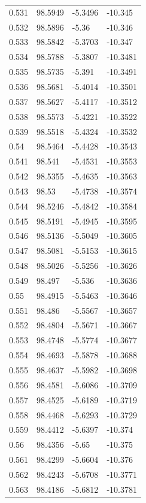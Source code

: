 \begin{tabular}{llll}
0.531 & 98.5949 & -5.3496 & -10.345 \\
0.532 & 98.5896 & -5.36 & -10.346 \\
0.533 & 98.5842 & -5.3703 & -10.347 \\
0.534 & 98.5788 & -5.3807 & -10.3481 \\
0.535 & 98.5735 & -5.391 & -10.3491 \\
0.536 & 98.5681 & -5.4014 & -10.3501 \\
0.537 & 98.5627 & -5.4117 & -10.3512 \\
0.538 & 98.5573 & -5.4221 & -10.3522 \\
0.539 & 98.5518 & -5.4324 & -10.3532 \\
0.54 & 98.5464 & -5.4428 & -10.3543 \\
0.541 & 98.541 & -5.4531 & -10.3553 \\
0.542 & 98.5355 & -5.4635 & -10.3563 \\
0.543 & 98.53 & -5.4738 & -10.3574 \\
0.544 & 98.5246 & -5.4842 & -10.3584 \\
0.545 & 98.5191 & -5.4945 & -10.3595 \\
0.546 & 98.5136 & -5.5049 & -10.3605 \\
0.547 & 98.5081 & -5.5153 & -10.3615 \\
0.548 & 98.5026 & -5.5256 & -10.3626 \\
0.549 & 98.497 & -5.536 & -10.3636 \\
0.55 & 98.4915 & -5.5463 & -10.3646 \\
0.551 & 98.486 & -5.5567 & -10.3657 \\
0.552 & 98.4804 & -5.5671 & -10.3667 \\
0.553 & 98.4748 & -5.5774 & -10.3677 \\
0.554 & 98.4693 & -5.5878 & -10.3688 \\
0.555 & 98.4637 & -5.5982 & -10.3698 \\
0.556 & 98.4581 & -5.6086 & -10.3709 \\
0.557 & 98.4525 & -5.6189 & -10.3719 \\
0.558 & 98.4468 & -5.6293 & -10.3729 \\
0.559 & 98.4412 & -5.6397 & -10.374 \\
0.56 & 98.4356 & -5.65 & -10.375 \\
0.561 & 98.4299 & -5.6604 & -10.376 \\
0.562 & 98.4243 & -5.6708 & -10.3771 \\
0.563 & 98.4186 & -5.6812 & -10.3781 \\

\end{tabular}
